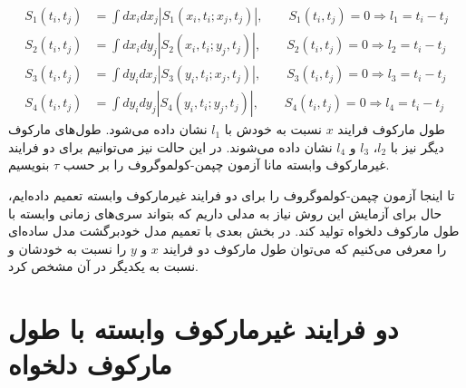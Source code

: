 \begin{equation}
\begin{aligned} 
  S_{1}(t_{i}, t_{j}) &=\int d x_{i} d x_{j}\left|S_{1}(x_{i}, t_{i}; x_{j}, t_{j})\right|, \quad \quad S_{1}(t_{i}, t_{j})=0 \Longrightarrow l_1=t_{i}-t_{j} \\
  S_{2}(t_{i}, t_{j}) &=\int d x_{i} d y_{j}\left|S_{2}(x_{i}, t_{i}; y_{j}, t_{j})\right|, \quad \quad S_{2}(t_{i}, t_{j})=0 \Longrightarrow l_2=t_{i}-t_{j}  \\
  S_{3}(t_{i}, t_{j}) &=\int d y_{i} d x_{j}\left|S_{3}(y_{i}, t_{i}; x_{j}, t_{j})\right|, \quad \quad S_{3}(t_{i}, t_{j})=0 \Longrightarrow l_3=t_{i}-t_{j} \\
  S_{4}(t_{i}, t_{j}) &=\int d y_{i} d y_{j}\left|S_{4}(y_{i}, t_{i}; y_{j}, t_{j})\right|, \quad \quad S_{4}(t_{i}, t_{j})=0 \Longrightarrow l_4=t_{i}-t_{j}  \end{aligned}
  \label{coupled_cktest}
\end{equation}
طول مارکوف فرایند $x$ نسبت به خودش با $l_1$ نشان داده می‌شود. طول‌های مارکوف دیگر نیز با $l_2$، $l_3$ و $l_4$ نشان داده می‌شوند.
در این حالت نیز می‌توانیم برای دو فرایند غیرمارکوف وابسته مانا آزمون چپمن-کولموگروف را بر حسب $\tau$ بنویسیم. 

تا اینجا آزمون چپمن-کولموگروف را برای دو فرایند غیرمارکوف وابسته تعمیم داده‌ایم، حال برای آزمایش این روش نیاز به 
مدلی داریم که بتواند سری‌های زمانی وابسته با طول مارکوف دلخواه تولید کند. در بخش بعدی با تعمیم مدل خودبرگشت 
مدل ساده‌ای را معرفی می‌کنیم که می‌توان طول مارکوف دو فرایند $x$ و $y$ را نسبت به خودشان و نسبت به 
یکدیگر در آن مشخص کرد.

\section{دو فرایند غیرمارکوف وابسته با طول مارکوف دلخواه}

